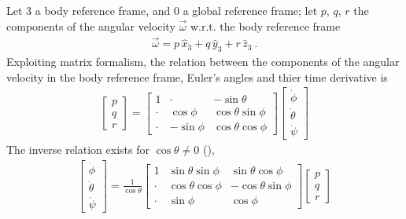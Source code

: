 \documentclass[letterpaper,10pt,english]{jupyterBook}
\begin{document}
\sphinxAtStartPar
Let \(3\) a body reference frame, and \(0\) a global reference frame; let \(p\), \(q\), \(r\) the components of the angular velocity \(\vec{\omega}\) w.r.t. the body reference frame
\begin{equation*}
\begin{split}\vec{\omega} = p \, \hat{x}_3 + q \, \hat{y}_3 + r \, \hat{z}_3 \ .\end{split}
\end{equation*}
\sphinxAtStartPar
Exploiting matrix formalism, the relation between the components of the angular velocity in the body reference frame, Euler’s angles and thier time derivative is
\begin{equation*}
\begin{split}
\begin{bmatrix} p \\ q \\ r \end{bmatrix} = 
\begin{bmatrix} 1 & \cdot & - \sin \theta \\ \cdot & \cos \phi & \cos \theta \sin \phi \\ \cdot & - \sin \phi & \cos \theta \cos \phi \end{bmatrix}
\begin{bmatrix} \dot{\phi} \\ \dot{\theta} \\ \dot{\psi} \end{bmatrix}
\end{split}
\end{equation*}
\sphinxAtStartPar
The inverse relation exists for \(\cos \theta \ne 0\) (),
\begin{equation*}
\begin{split}
\begin{bmatrix} \dot{\phi} \\ \dot{\theta} \\ \dot{\psi} \end{bmatrix} = 
\frac{1}{\cos \theta}
\begin{bmatrix} 1 & \sin \theta \sin \phi & \sin \theta \cos \phi \\ \cdot & \cos \theta \cos \phi & - \cos \theta \sin \phi \\ \cdot & \sin \phi & \cos \phi \end{bmatrix}
\begin{bmatrix} p \\ q \\ r \end{bmatrix} 
\end{split}
\end{equation*}
\end{document}
